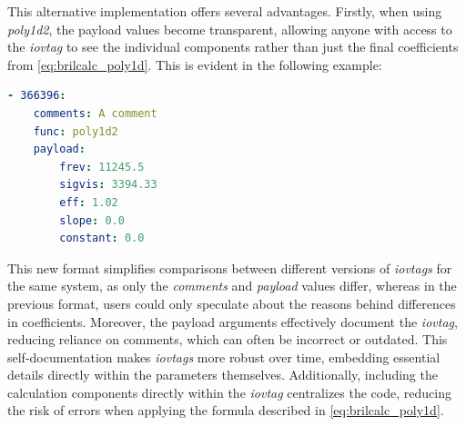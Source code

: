 



This alternative implementation offers several advantages. Firstly, when using \textit{poly1d2}, the payload values become transparent, allowing anyone with access to the \textit{iovtag} to see the individual components rather than just the final coefficients from \autoref{eq:brilcalc_poly1d}. This is evident in the following example:

\begin{lstlisting}[language=Yaml]
- 366396:
    comments: A comment
    func: poly1d2
    payload:
        frev: 11245.5
        sigvis: 3394.33
        eff: 1.02
        slope: 0.0
        constant: 0.0
\end{lstlisting}

This new format simplifies comparisons between different versions of \textit{iovtags} for the same system, as only the \textit{comments} and \textit{payload} values differ, whereas in the previous format, users could only speculate about the reasons behind differences in coefficients. Moreover, the payload arguments effectively document the \textit{iovtag}, reducing reliance on comments, which can often be incorrect or outdated. This self-documentation makes \textit{iovtags} more robust over time, embedding essential details directly within the parameters themselves. Additionally, including the calculation components directly within the \textit{iovtag} centralizes the code, reducing the risk of errors when applying the formula described in \autoref{eq:brilcalc_poly1d}.

